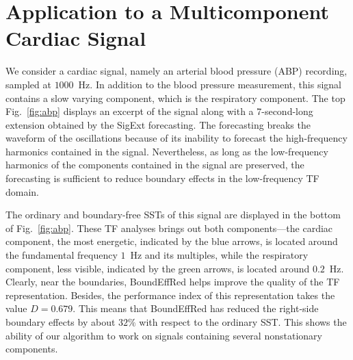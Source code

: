 \documentclass[journal,onecolumn]{IEEEtran}
\begin{document}
{\color{red}
\section{Application to a Multicomponent Cardiac Signal}
We consider a cardiac signal, namely an arterial blood pressure (ABP) recording, sampled at $1000$~Hz. In addition to the blood pressure measurement, this signal contains a slow varying component, which is the respiratory component. The top Fig.~\ref{fig:abp} displays an excerpt of the signal along with a 7-second-long extension obtained by the {\sf SigExt} forecasting. The forecasting breaks the waveform of the oscillations because of its inability to forecast the high-frequency harmonics contained in the signal. Nevertheless, as long as the low-frequency harmonics of the components contained in the signal are preserved, the forecasting is sufficient to reduce boundary effects in the low-frequency TF domain.

The ordinary and boundary-free SSTs of this signal are displayed in the bottom of Fig.~\ref{fig:abp}. These TF analyses brings out both components---the cardiac component, the most energetic, indicated by the blue arrows, is located around the fundamental frequency $1$~Hz and its multiples, while the respiratory component, less visible, indicated by the green arrows, is located around $0.2$~Hz. Clearly, near the boundaries, {\sf BoundEffRed} helps improve the quality of the TF representation. Besides, the performance index of this representation takes the value $D=0.679$. This means that {\sf BoundEffRed} has reduced the right-side boundary effects by about $32\%$ with respect to the ordinary SST. This shows the ability of our algorithm to work on signals containing several nonstationary components.

}
\end{document}
